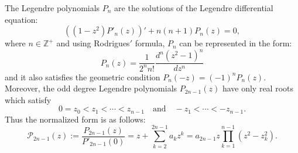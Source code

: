 \documentclass[12pt, reqno]{amsart}
\numberwithin{equation}{section}
\theoremstyle{plain}
\theoremstyle{definition}
\theoremstyle{remark}
\begin{document}
The Legendre polynomials $P_{n}$ are the solutions of the Legendre differential equation:
$$((1-z^2)P'_{n}(z))'+n(n+1)P_{n}(z)=0,$$
where $n\in \mathbb{Z}^{+}$ and using Rodrigues$'$ formula, $P_{n}$ can be represented in the form:
$$P_{n}(z)=\frac{1}{2^n n!}\frac{d^n(z^2-1)^n}{dz^n}$$
and it also satisfies the geometric condition $P_n(-z)=(-1)^n P_{n}(z)$. Moreover, the odd degree Legendre polynomials $P_{2n-1}(z)$  have only real roots which satisfy 
\begin{equation}\label{legdroot}
0=z_0<z_1<\cdots<z_{n-1}\quad\text{and}\quad -z_1<\cdots<-z_{n-1}.
\end{equation}
Thus the normalized form is as follows:
\begin{equation}\label{legd1}
\mathcal{P}_{2n-1}(z):=\frac{P_{2n-1}(z)}{P'_{2n-1}(0)}=z+\sum_{k=2}^{2n-1}a_{k}z^{k}=a_{2n-1}z\prod_{k=1}^{n-1}(z^2-z^2_{k}).
\end{equation} 
\end{document}

